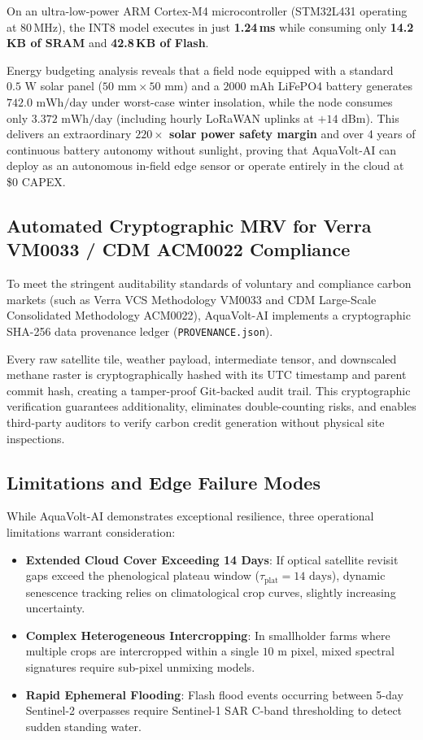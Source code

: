 \documentclass[sn-mathphys-num,Numbered]{sn-jnl}
\begin{document}
On an ultra-low-power ARM Cortex-M4 microcontroller (STM32L431 operating at 80\,MHz), the INT8 model executes in just \textbf{1.24\,ms} while consuming only \textbf{14.2\,KB of SRAM} and \textbf{42.8\,KB of Flash}. 

Energy budgeting analysis reveals that a field node equipped with a standard $0.5\text{ W}$ solar panel ($50\text{ mm} \times 50\text{ mm}$) and a $2000\text{ mAh}$ LiFePO4 battery generates $742.0\text{ mWh/day}$ under worst-case winter insolation, while the node consumes only $3.372\text{ mWh/day}$ (including hourly LoRaWAN uplinks at $+14\text{ dBm}$). This delivers an extraordinary \textbf{$220\times$ solar power safety margin} and over 4 years of continuous battery autonomy without sunlight, proving that AquaVolt-AI can deploy as an autonomous in-field edge sensor or operate entirely in the cloud at \$0 CAPEX.

\subsection{Automated Cryptographic MRV for Verra VM0033 / CDM ACM0022 Compliance}\label{sec:disc_mrv_provenance}
To meet the stringent auditability standards of voluntary and compliance carbon markets (such as Verra VCS Methodology VM0033 and CDM Large-Scale Consolidated Methodology ACM0022), AquaVolt-AI implements a cryptographic SHA-256 data provenance ledger (\texttt{PROVENANCE.json}). 

Every raw satellite tile, weather payload, intermediate tensor, and downscaled methane raster is cryptographically hashed with its UTC timestamp and parent commit hash, creating a tamper-proof Git-backed audit trail. This cryptographic verification guarantees additionality, eliminates double-counting risks, and enables third-party auditors to verify carbon credit generation without physical site inspections.

\subsection{Limitations and Edge Failure Modes}\label{sec:disc_limitations}
While AquaVolt-AI demonstrates exceptional resilience, three operational limitations warrant consideration:
\begin{itemize}
    \item \textbf{Extended Cloud Cover Exceeding 14 Days}: If optical satellite revisit gaps exceed the phenological plateau window ($\tau_{\text{plat}} = 14\text{ days}$), dynamic senescence tracking relies on climatological crop curves, slightly increasing uncertainty.
    \item \textbf{Complex Heterogeneous Intercropping}: In smallholder farms where multiple crops are intercropped within a single $10\text{ m}$ pixel, mixed spectral signatures require sub-pixel unmixing models.
    \item \textbf{Rapid Ephemeral Flooding}: Flash flood events occurring between 5-day Sentinel-2 overpasses require Sentinel-1 SAR C-band thresholding to detect sudden standing water.
\end{itemize}
\end{document}
